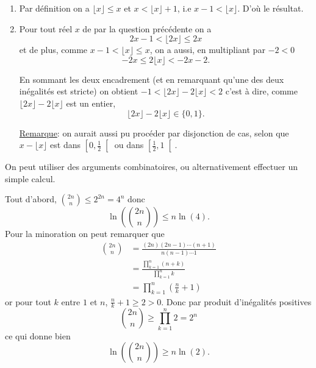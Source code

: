 
\begin{sol}
    \begin{enumerate}
        \item Par définition on a $\lfloor x \rfloor \leq x$ et $x <\lfloor x \rfloor +1$, i.e $x -1 <\lfloor x \rfloor $. D'où le résultat.
        \item Pour tout réel $x$ de par la question précédente on a
              \[2x-1 < \lfloor 2x  \rfloor \leq 2x\]
              et de plus, comme $x-1 < \lfloor x  \rfloor \leq x$,
              on a aussi, en multipliant par $-2 < 0$
              \[-2x \leq 2 \lfloor x  \rfloor < -2x-2.\]

              En sommant les deux encadrement (et en remarquant qu'une des deux inégalités est stricte) on obtient
              $-1 <\lfloor 2x  \rfloor - 2 \lfloor x  \rfloor< 2$
              c'est à dire, comme $\lfloor 2x  \rfloor - 2 \lfloor x  \rfloor$ est un entier,
              \[\boxed{\lfloor 2 x \rfloor  - 2 \lfloor x \rfloor \in \{0,1\}}.\]

              \underline{Remarque}: on aurait aussi pu procéder par disjonction de cas, selon que $x - \lfloor x \rfloor$ est dans $\left[0,\frac{1}{2}\right[$ ou dans $\left[\frac{1}{2},1\right[$.
    \end{enumerate}
\end{sol}

\begin{sol}
    On peut utiliser des arguments combinatoires, ou alternativement effectuer un simple calcul.

    Tout d'abord, $\binom{2n}{n} \leq 2^{2n} = 4^n$ donc 
    \[\boxed{\ln \left(\binom{2n}{n} \right) \leq n \ln(4)}.\]
    Pour la minoration on peut remarquer que
    \[\begin{aligned}\binom{2n}{n} &= \frac{(2n) (2n-1) \cdots (n+1) }{n (n-1) \cdots 1}\\
        &= \frac{\prod_{k=1}^{n} (n+k)}{\prod_{k=1}^n k} \\
        &= \prod_{k=1}^n \left(\frac{n}{k}+1 \right) \end{aligned}\]
    or pour tout $k$ entre $1$ et $n$, $\frac{n}{k}+1 \geq 2 >0$. Donc par produit d'inégalités positives
    \[\binom{2n}{n} \geq \prod_{k=1}^n 2 = 2^n\]
    ce qui donne bien 
    \[\boxed{\ln \left(\binom{2n}{n} \right) \geq n \ln(2)}.\]
\end{sol}

